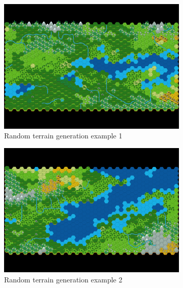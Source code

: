 \documentclass[english]{tudscrreprt}
\begin{document}
\begin{figure}[h]
\centering
\begin{subfigure}[b]{0.32\textwidth}
    \includegraphics[width=\textwidth]{figures/hexGrid1.png}
    \caption{Random terrain generation example 1}
    \label{fig:terrain_1}
\end{subfigure}
\hfill
\begin{subfigure}[b]{0.32\textwidth}
    \includegraphics[width=\textwidth]{figures/hexGrid2.png}
    \caption{Random terrain generation example 2}
    \label{fig:terrain_2}
\end{subfigure}
\hfill
\begin{subfigure}[b]{0.32\textwidth}

\end{subfigure}
\end{figure}
\end{document}

